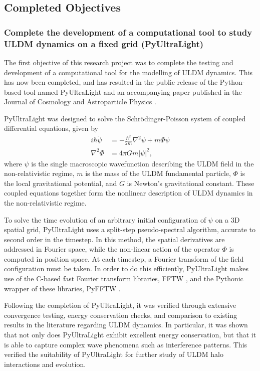 \subsection{Completed Objectives}

\subsubsection{Complete the development of a computational tool to study ULDM dynamics on a fixed grid (PyUltraLight)}

The first objective of this research project was to complete the testing and development of a computational tool for the modelling of ULDM dynamics. This has now been completed, and has resulted in the public release of the Python-based tool named PyUltraLight and an accompanying paper published in the Journal  of Cosmology and Astroparticle Physics \cite{Edwards:2018ccc}. 

PyUltraLight was designed to solve the Schr{\"o}dinger-Poisson system of coupled differential equations, given by
\begin{align}\label{eq:SP}
    i\hbar\Dot{\psi}&=-\frac{\hbar^2}{2m}\nabla^2\psi+m\Phi\psi \\
    \nabla^2\Phi&=4\pi G m \vert\psi\vert^2,
\end{align}
where $\psi$ is the single macroscopic wavefunction describing the ULDM field in the non-relativistic regime, $m$ is the mass of the ULDM fundamental particle, $\Phi$ is the local gravitational potential, and $G$ is Newton's gravitational constant. These coupled equations together form the nonlinear description of ULDM dynamics in the non-relativistic regime. 

To solve the time evolution of an arbitrary initial configuration of $\psi$ on a 3D spatial grid, PyUltraLight uses a split-step pseudo-spectral algorithm, accurate to second order in the timestep. In this method, the spatial derivatives are addressed in Fourier space, while the non-linear action of the operator $\Phi$ is computed in position space. At each timestep, a Fourier transform of the field configuration must be taken. In order to do this efficiently, PyUltraLight makes use of the C-based fast Fourier transform libraries, FFTW \cite{1386650}, and the Pythonic wrapper of these libraries, PyFFTW \cite{pyfftw}. 

Following the completion of PyUltraLight, it was verified through extensive convergence testing, energy conservation checks, and comparison to existing results in the literature regarding ULDM dynamics. In particular, it was shown that not only does PyUltraLight exhibit excellent energy conservation, but that it is able to capture complex wave phenomena such as interference patterns. This verified the suitability of PyUltraLight for further study of ULDM halo interactions and evolution.


